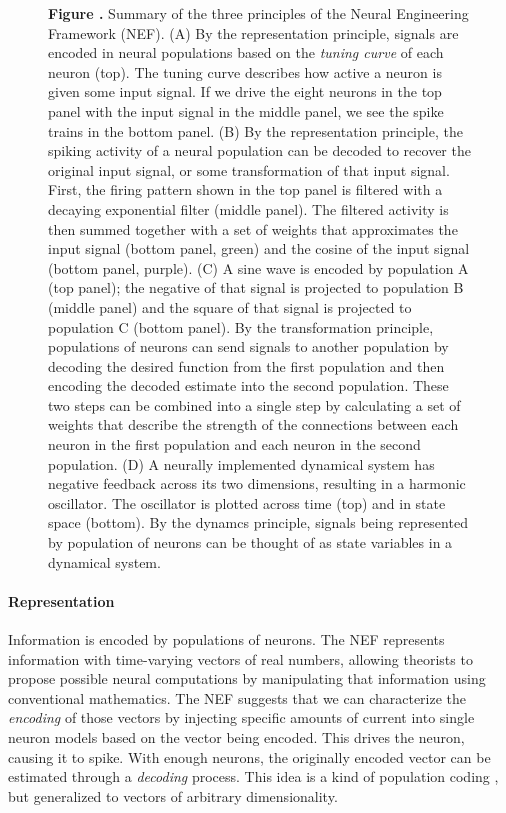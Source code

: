\documentclass{frontiersSCNS}
\begin{document}
\begin{figure}
\begin{center}
\end{center}
 \textbf{\label{fig:nef} Figure .}{
   Summary of the three principles of the Neural Engineering Framework
   (NEF). (A) By the representation principle, signals are encoded
   in neural populations based on the \textit{tuning curve}
   of each neuron (top). The tuning curve describes
   how active a neuron is given some input signal.
   If we drive the eight neurons in the top panel
   with the input signal in the middle panel,
   we see the spike trains in the bottom panel.
   (B) By the representation principle,
   the spiking activity of a neural population
   can be decoded to recover the original input signal,
   or some transformation of that input signal.
   First, the firing pattern shown in the top panel
   is filtered with a decaying exponential filter (middle panel).
   The filtered activity is then summed together
   with a set of weights that approximates
   the input signal (bottom panel, green)
   and the cosine of the input signal (bottom panel, purple).
   (C) A sine wave is encoded by population A (top panel);
   the negative of that signal is projected
   to population B (middle panel)
   and the square of that signal is projected
   to population C (bottom panel).
   By the transformation principle,
   populations of neurons can send signals
   to another population by decoding
   the desired function from the first population
   and then encoding the decoded estimate
   into the second population.
   These two steps can be combined into a single step
   by calculating a set of weights
   that describe the strength of the connections
   between each neuron in the first population
   and each neuron in the second population.
   (D) A neurally implemented dynamical system
   has negative feedback across its two dimensions,
   resulting in a harmonic oscillator.
   The oscillator is plotted across time (top)
   and in state space (bottom).
   By the dynamcs principle,
   signals being represented by population of neurons
   can be thought of as state variables in a dynamical system.
   }
\end{figure}

\paragraph{Representation}
Information is encoded by populations of neurons.
The NEF represents information
with time-varying vectors of real numbers,
allowing theorists to propose possible
neural computations by
manipulating that information
using conventional mathematics.
The NEF suggests that we can characterize
the \textit{encoding} of
those vectors by injecting
specific amounts of current into
single neuron models based on
the vector being encoded.
This drives the neuron,
causing it to spike.
With enough neurons,
the originally encoded vector
can be estimated
through a \textit{decoding} process.
This idea is a kind of population coding
\citep{georgopoulos1986, salinas1994}, but generalized
to vectors of arbitrary dimensionality.
\end{document}
